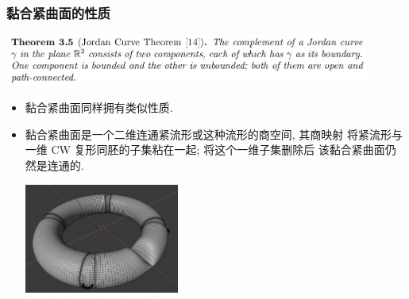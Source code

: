 \documentclass[UTF8]{ctexbeamer}	%
\theoremstyle{plain}
\theoremstyle{definition}
\theoremstyle{remark}
\numberwithin{equation}{section}
\begin{document}
\begin{frame}
    \frametitle{黏合紧曲面的性质}
    \begin{center}
        \includegraphics[width = 0.9\textwidth]{fig/jordancurve.png}
    \end{center}
    \vspace{-0.2in}
        \begin{itemize}
            \item 黏合紧曲面同样拥有类似性质.
            \item 黏合紧曲面是一个二维连通紧流形或这种流形的商空间, 其商映射
            将紧流形与一维 CW 复形同胚的子集粘在一起; 将这个一维子集删除后
            该黏合紧曲面仍然是连通的.
            \begin{center}
                \includegraphics[width = 0.4\textwidth]{fig/past.png}
            \end{center}
        \end{itemize}
\end{frame}
\end{document}
